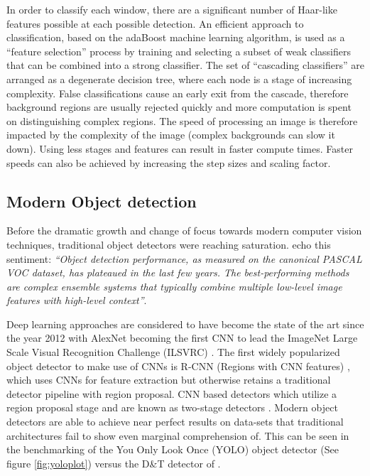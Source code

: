 \documentclass[a4paper,twoside,12pt]{report}
\begin{document}
In order to classify each window, there are a significant number of Haar-like features possible at each possible detection. An efficient approach to classification, based on the adaBoost machine learning algorithm, is used as a ``feature selection'' process by training and selecting a subset of weak classifiers that can be combined into a strong classifier. The set of ``cascading classifiers'' are arranged as a degenerate decision tree, where each node is a stage of increasing complexity. False classifications cause an early exit from the cascade, therefore background regions are usually rejected quickly and more computation is spent on distinguishing complex regions. The speed of processing an image is therefore impacted by the complexity of the image (complex backgrounds can slow it down). Using less stages and features can result in faster compute times. Faster speeds can also be achieved by increasing the step sizes and scaling factor.

\newpage
\subsection{Modern Object detection}

Before the dramatic growth and change of focus towards modern computer vision techniques, traditional object detectors were reaching saturation. \citep{rcnn} echo this sentiment: \textit{``Object detection performance, as measured on the canonical PASCAL VOC dataset, has plateaued in the last few years. The best-performing methods are complex ensemble systems that typically combine multiple low-level image features with high-level context''}.

Deep learning approaches are considered to have become the state of the art since the year 2012 with AlexNet becoming the first CNN to lead the ImageNet Large Scale Visual Recognition Challenge (ILSVRC) \citep{alexnet}. The first widely popularized object detector to make use of CNNs is R-CNN (Regions with CNN features) \citep{rcnn}, which uses CNNs for feature extraction but otherwise retains a traditional detector pipeline with region proposal. CNN based detectors which utilize a region proposal stage and are known as two-stage detectors \citep{comprehensive}.  Modern object detectors are able to achieve near perfect results on data-sets that traditional architectures fail to show even marginal comprehension of. This can be seen in the benchmarking of the You Only Look Once (YOLO) object detector (See figure \ref{fig:yoloplot}) \citep{yolo} versus the D\&T detector of \cite{hog}.
\end{document}
